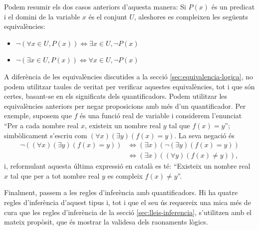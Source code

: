 \bigskip

Podem resumir els dos casos anteriors d'aquesta manera: Si $P(x)$ és un
predicat i el domini de la variable $x$ és el conjunt $U$, aleshores es
compleixen les següents equivalències:

\begin{itemize}
\item $\lnot\left( \forall x\in U,P(x)\right) \Longleftrightarrow\exists
x\in U,\lnot P\left( x\right) $

\item $\lnot\left( \exists x\in U,P\left( x\right) \right)
\Longleftrightarrow\forall x\in U,\lnot P\left( x\right) $
\end{itemize}

\bigskip

A diferència de les equivalències discutides a la secció \ref{sec:equivalencia-logica}, no podem utilitzar taules de veritat per verificar aquestes equivalències, tot i que són certes, basant-se en els significats dels
quantificadors. Podem utilitzar les equivalències anteriors per negar
proposicions amb més d'un quantificador. Per exemple, suposem que $f$
és una funció real de variable i considerem l'enunciat \enquote{Per a cada
nombre real $x$, existeix un nombre real $y$ tal que $f(x)=y$}; simbòlicament s'escriu com $\left( \forall x\right) \left( \exists y\right)
\left( f(x)=y\right).$ La seva negació és\begin{align*}
\lnot\left( \left( \forall x\right) \left( \exists y\right) \left(
f(x)=y\right) \right) & \Longleftrightarrow\left( \exists x\right) \left(
\lnot\left( \exists y\right) \left( f(x)=y\right) \right) \\
& \Longleftrightarrow\left( \exists x\right) \left( \left( \forall y\right)
\left( f(x)\neq y\right) \right) \text{,}
\end{align*}
i, reformulant aquesta última expressió en català es té:
\enquote{Existeix un nombre real $x$ tal que per a tot nombre real $y$ es compleix $f(x)\neq y$}.

\bigskip

Finalment, passem a les regles d'inferència amb quantificadors. Hi ha
quatre regles d'inferència d'aquest tipus i, tot i que el seu ús
requereix una mica més de cura que les regles d'inferència de la
secció \ref{sec:lleis-inferencia}, s'utilitzen amb el mateix propòsit, que és
mostrar la validesa dels raonaments lògics.

